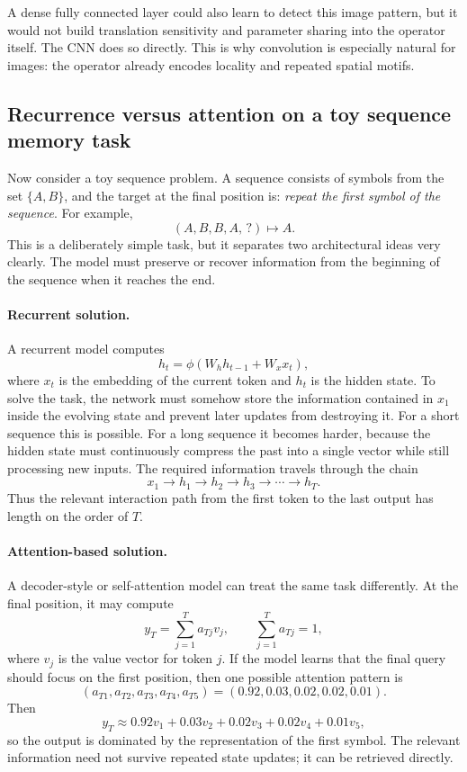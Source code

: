 A dense fully connected layer could also learn to detect this image pattern, but it would not build translation sensitivity and parameter sharing into the operator itself.
The CNN does so directly.
This is why convolution is especially natural for images: the operator already encodes locality and repeated spatial motifs.

\subsection*{Recurrence versus attention on a toy sequence memory task}

Now consider a toy sequence problem.
A sequence consists of symbols from the set $\{A,B\}$, and the target at the final position is: \emph{repeat the first symbol of the sequence}.
For example,
\[
(A,B,B,A,\, ?)
\longmapsto A.
\]
This is a deliberately simple task, but it separates two architectural ideas very clearly.
The model must preserve or recover information from the beginning of the sequence when it reaches the end.

\paragraph{Recurrent solution.}
A recurrent model computes
\[
h_t = \phi(W_h h_{t-1} + W_x x_t),
\]
where $x_t$ is the embedding of the current token and $h_t$ is the hidden state.
To solve the task, the network must somehow store the information contained in $x_1$ inside the evolving state and prevent later updates from destroying it.
For a short sequence this is possible.
For a long sequence it becomes harder, because the hidden state must continuously compress the past into a single vector while still processing new inputs.
The required information travels through the chain
\[
x_1 \to h_1 \to h_2 \to h_3 \to \cdots \to h_T.
\]
Thus the relevant interaction path from the first token to the last output has length on the order of $T$.

\paragraph{Attention-based solution.}
A decoder-style or self-attention model can treat the same task differently.
At the final position, it may compute
\[
y_T = \sum_{j=1}^{T} a_{Tj} v_j,
\qquad
\sum_{j=1}^{T} a_{Tj}=1,
\]
where $v_j$ is the value vector for token $j$.
If the model learns that the final query should focus on the first position, then one possible attention pattern is
\[
(a_{T1},a_{T2},a_{T3},a_{T4},a_{T5})
=(0.92,0.03,0.02,0.02,0.01).
\]
Then
\[
y_T \approx 0.92 v_1 + 0.03 v_2 + 0.02 v_3 + 0.02 v_4 + 0.01 v_5,
\]
so the output is dominated by the representation of the first symbol.
The relevant information need not survive repeated state updates; it can be retrieved directly.

